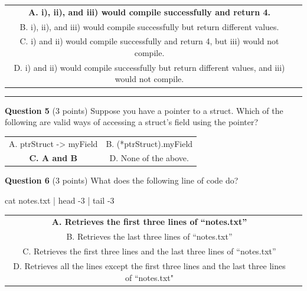 \documentclass{exam}
\begin{document}
\begin{center}

\begin{tabular} { c  c } 
  \textbf{A. i), ii), and iii) would compile successfully and return 4.}\\
  B. i), ii), and iii) would compile successfully but return different values. \\ 
  C. i) and ii) would compile successfully and return 4, but iii) would not compile. \\ 
  D. i) and ii) would compile successfully but return different values, and iii) would not compile.
\end{tabular}

\end{center}

\vspace{10px}

\newpage




\begin{center}\noindent\rule{6in}{0.4pt}\end{center}

\textbf{Question 5} (3 points) Suppose you have a pointer to a struct. Which of the following are valid ways of accessing a struct’s field using the pointer?

\begin{center}

\begin{tabular} { c  c } 
  A. ptrStruct -> myField &
  B. (*ptrStruct).myField \\ 
  \textbf{C. A and B} &
  D. None of the above.
\end{tabular}

\end{center}

\vspace{10px}

\textbf{Question 6} (3 points) What does the following line of code do?

\begin{center}
cat notes.txt | head -3 | tail -3
\end{center}

\begin{center}

\begin{tabular} { c  c } 
  \textbf{A. Retrieves the first three lines of “notes.txt”}\\
  B. Retrieves the last three lines of “notes.txt” \\ 
  C. Retrieves the first three lines and the last three lines of “notes.txt” \\ 
  D. Retrieves all the lines except the first three lines and the last three lines of “notes.txt"
\end{tabular}

\end{center}
\end{document}
